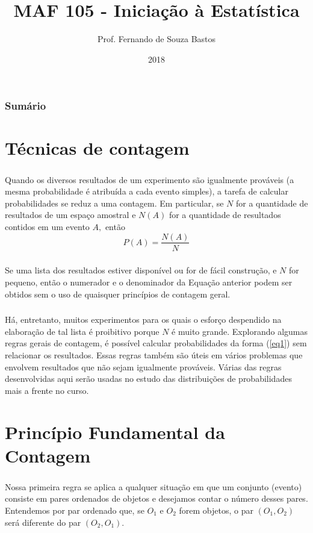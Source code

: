 \documentclass[14pt,aspectratio=1610]{beamer}
\title{MAF 105 - Iniciação à Estatística}
\author{Prof. Fernando de Souza Bastos}
\institute{Instituto de Ciências Exatas e Tecnológicas\texorpdfstring{\\ Universidade Federal de Viçosa}{}\texorpdfstring{\\ Campus UFV - Florestal}{}}
\date{2018}
\begin{document}


\frame{\titlepage}

\begin{frame}{}
\frametitle{\bf Sumário}
\tableofcontents
\end{frame}

\section{Técnicas de contagem}
\begin{frame}{}
\frametitle{}
\begin{block}{}
\justifying
Quando os diversos resultados de um experimento são igualmente prováveis (a mesma probabilidade é atribuída a cada evento simples), a tarefa de calcular probabilidades se reduz a uma contagem. Em particular, se $N$ for a quantidade de resultados de um espaço amostral e $N(A)$ for a quantidade de resultados contidos em um evento $A,$ então 
\begin{equation}\label{eq1}
P(A)=\dfrac{N(A)}{N}
\end{equation}
\end{block}
\end{frame}

\begin{frame}{}
\frametitle{}
\begin{block}{}
\justifying
Se uma lista dos resultados estiver disponível ou for de fácil construção, e $N$ for pequeno, então o numerador e o denominador da Equação anterior podem ser obtidos sem o uso de quaisquer princípios de contagem geral.
\end{block}
\end{frame}

\begin{frame}{}
\frametitle{}
\begin{block}{}
\justifying
Há, entretanto, muitos experimentos para os quais o esforço despendido na elaboração de tal lista é proibitivo porque $N$ é muito grande. Explorando algumas regras gerais de contagem, é possível calcular probabilidades da forma (\ref{eq1}) sem relacionar os resultados. Essas regras também são úteis em vários problemas que envolvem resultados que não sejam igualmente prováveis. Várias das regras desenvolvidas aqui serão usadas
no estudo das distribuições de probabilidades mais a frente no curso.
\end{block}
\end{frame}

\section{Princípio Fundamental da Contagem}
\begin{frame}{}
\frametitle{}
\begin{block}{}
\justifying
Nossa primeira regra se aplica a qualquer situação em que um conjunto (evento) consiste em pares ordenados de objetos e desejamos contar o número desses pares. Entendemos por par ordenado que, se $O_{1}$ e $O_{2}$ forem objetos, o par $(O_1, O_2)$ será diferente do par $(O_2, O_1).$
\end{block}
\end{frame}
\end{document}
